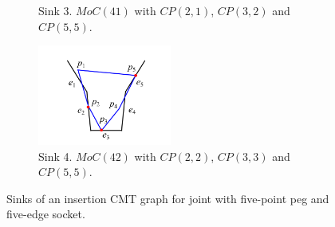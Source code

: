 \documentclass[11pt, twocolumn]{article}
\begin{document}
\begin{figure}
\begin{center}
\begin{subfigure}[t]{0.24\textwidth}
\begin{center}
\end{center}
\caption{Sink 3. $MoC(41)$ with $CP(2, 1)$, $CP(3, 2)$ and $CP(5, 5)$. }
\label{fig:5_5_sink3}
\end{subfigure}
\begin{subfigure}[t]{0.24\textwidth}
\begin{center}
\includegraphics[height=1.3in]{figures/5_5_sink4.png}
\end{center}
\caption{Sink 4. $MoC(42)$ with $CP(2, 2)$, $CP(3, 3)$ and $CP(5, 5)$.  }
\label{fig:5_5_sink4}
\end{subfigure}
\end{center}
\caption{Sinks of an insertion CMT graph for joint with five-point peg and five-edge socket. }
\label{fig:5_5_sink}
\end{figure}










\end{document}

